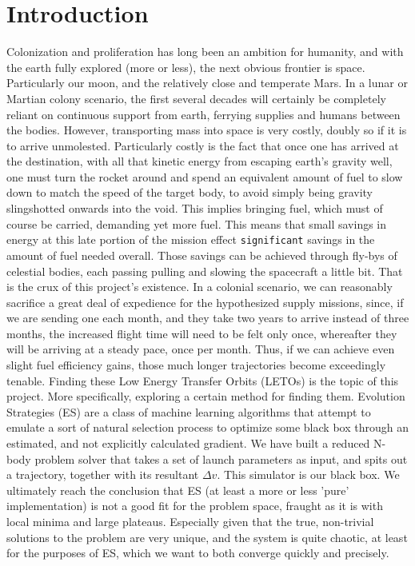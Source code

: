 
\chapter{Introduction}
Colonization and proliferation has long been an ambition for humanity, and with the earth fully explored (more or less), the next obvious frontier is space. Particularly our moon, and the relatively close and temperate Mars. In a lunar or Martian colony scenario, the first several decades will certainly be completely reliant on continuous support from earth, ferrying supplies and humans between the bodies. However, transporting mass into space is very costly, doubly so if it is to arrive unmolested. Particularly costly is the fact that once one has arrived at the destination, with all that kinetic energy from escaping earth's gravity well, one must turn the rocket around and spend an equivalent amount of fuel to slow down to match the speed of the target body, to avoid simply being gravity slingshotted onwards into the void. This implies bringing fuel, which must of course be carried, demanding yet more fuel. This means that small savings in energy at this late portion of the mission effect \texttt{significant} savings in the amount of fuel needed overall. Those savings can be achieved through fly-bys of celestial bodies, each passing pulling and slowing the spacecraft a little bit. That is the crux of this project's existence. In a colonial scenario, we can reasonably sacrifice a great deal of expedience for the hypothesized supply missions, since, if we are sending one each month, and they take two years to arrive instead of three months, the increased flight time will need to be felt only once, whereafter they will be arriving at a steady pace, once per month. Thus, if we can achieve even slight fuel efficiency gains, those much longer trajectories become exceedingly tenable. Finding these Low Energy Transfer Orbits (LETOs) is the topic of this project. More specifically, exploring a certain method for finding them. Evolution Strategies (ES) are a class of machine learning algorithms that attempt to emulate a sort of natural selection process to optimize some black box through an estimated, and not explicitly calculated gradient. We have built a reduced N-body problem solver that takes a set of launch parameters as input, and spits out a trajectory, together with its resultant $\Delta v$. This simulator is our black box. We ultimately reach the conclusion that ES (at least a more or less 'pure' implementation) is not a good fit for the problem space, fraught as it is with local minima and large plateaus. Especially given that the true, non-trivial solutions to the problem are very unique, and the system is quite chaotic, at least for the purposes of ES, which we want to both converge quickly and precisely.

